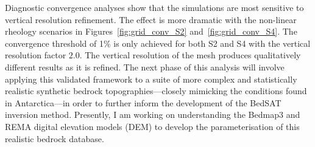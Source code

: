 Diagnostic convergence analyses show that the simulations are most sensitive to vertical resolution refinement. The effect is more dramatic with the non-linear rheology scenarios in Figures~\ref{fig:grid_conv_S2} and~\ref{fig:grid_conv_S4}. The convergence threshold of 1\% is only achieved for both S2 and S4 with the vertical resolution factor $2.0$. The vertical resolution of the mesh produces qualitatively different results as it is refined.
The next phase of this analysis will involve applying this validated framework to a suite of more complex and statistically realistic synthetic bedrock topographies—closely mimicking the conditions found in Antarctica—in order to further inform the development of the BedSAT inversion method. Presently, I am working on understanding the Bedmap3 and REMA digital elevation models (DEM) to develop the parameterisation of this realistic bedrock database.



